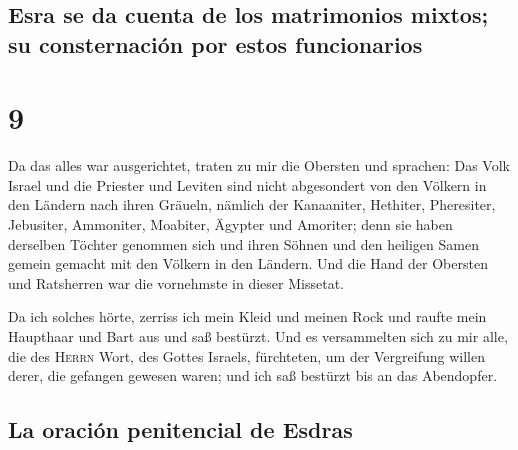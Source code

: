 \hypertarget{esra-se-da-cuenta-de-los-matrimonios-mixtos-su-consternaciuxf3n-por-estos-funcionarios}{%
\subsection{Esra se da cuenta de los matrimonios mixtos; su
consternación por estos
funcionarios}\label{esra-se-da-cuenta-de-los-matrimonios-mixtos-su-consternaciuxf3n-por-estos-funcionarios}}

\hypertarget{section-8}{%
\section{9}\label{section-8}}

 Da das alles war ausgerichtet, traten zu mir die Obersten
und sprachen: Das Volk Israel und die Priester und Leviten sind nicht
abgesondert von den Völkern in den Ländern nach ihren Gräueln, nämlich
der Kanaaniter, Hethiter, Pheresiter, Jebusiter, Ammoniter, Moabiter,
Ägypter und Amoriter;  denn sie haben derselben Töchter
genommen sich und ihren Söhnen und den heiligen Samen gemein gemacht mit
den Völkern in den Ländern. Und die Hand der Obersten und Ratsherren war
die vornehmste in dieser Missetat.

 Da ich solches hörte, zerriss ich mein Kleid und meinen
Rock und raufte mein Haupthaar und Bart aus und saß bestürzt.
 Und es versammelten sich zu mir alle, die des
\textsc{Herrn} Wort, des Gottes Israels, fürchteten, um der Vergreifung
willen derer, die gefangen gewesen waren; und ich saß bestürzt bis an
das Abendopfer.

\hypertarget{la-oraciuxf3n-penitencial-de-esdras}{%
\subsection{La oración penitencial de
Esdras}\label{la-oraciuxf3n-penitencial-de-esdras}}

